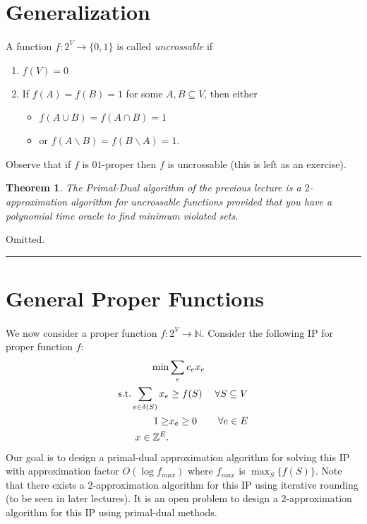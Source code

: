 \documentclass[letterpaper,12pt,oneside,onecolumn]{article}
\newcommand{\N}{\mathbb{N}} \newcommand{\R}{\mathbb{R}}
\newenvironment{proof}{{\bf Proof:  }}{\hfill\rule{2mm}{2mm}}
\newtheorem{theorem}[fact]{Theorem}
\begin{document}
\section{Generalization}
\paragraph{}
A function $f: 2^V \rightarrow \{0,1\}$ is called {\it uncrossable} if
\begin{enumerate}
\item $f(V) = 0$
\item If $f(A) = f(B) = 1$ for some $A,B \subseteq V$, then either
\begin{itemize}
\item$f(A\cup B) = f(A \cap B) = 1$
\item or $f(A\backslash B) = f(B\backslash A) = 1$.
\end{itemize}
\end{enumerate}
Observe that if $f$ is $01$-proper then $f$ is uncrossable (this is left as an exercise).
\begin{theorem}
The Primal-Dual algorithm of the previous lecture is a $2$-approximation algorithm for uncrossable functions provided that you have a polynomial time oracle to find minimum violated sets.
\end{theorem}
\begin{proof}
Omitted.
\end{proof}
\section{General Proper Functions}
\paragraph{}
We now consider a proper function $f : 2^V \rightarrow \N$. Consider the following IP for proper function $f$:
\begin{align*}
\min &\sum_e c_e x_e \\
\text{s.t.} \sum_{e\in \delta(S)} x_e &\geq f(S) &\forall S \subseteq V \\
1 \geq &x_e \geq 0 &\forall e \in E \\
x \in \mathbb{Z}^E.
\end{align*}
Our goal is to design a primal-dual approximation algorithm for solving this IP with approximation factor $O(\log f_{max})$ where $f_{max}$ is $\max_S\{f(S)\}$. Note that there exists a $2$-approximation algorithm for this IP using iterative rounding (to be seen in later lectures). It is an open problem to design a $2$-approximation algorithm for this IP using primal-dual methods.
\end{document}
